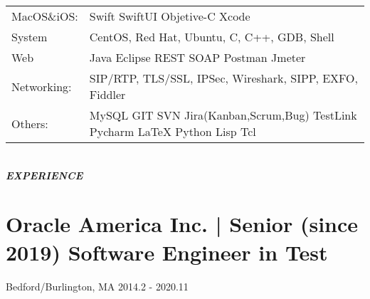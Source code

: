 \documentclass[11pt]{article}
\begin{document}
\begin{tabular}{l l}
MacOS\&iOS: & Swift \textbullet{} SwiftUI \textbullet{} Objetive-C \textbullet{} Xcode \\
System & CentOS, Red Hat, Ubuntu, C, C++, GDB, Shell \\
Web & Java \textbullet{} Eclipse \textbullet{} REST \textbullet{} SOAP \textbullet{} Postman \textbullet{} Jmeter \\
Networking: & SIP/RTP, TLS/SSL, IPSec, Wireshark, SIPP, EXFO, Fiddler \\
Others: & MySQL GIT \textbullet{} SVN \textbullet{} Jira(Kanban,Scrum,Bug) \textbullet{} TestLink Pycharm LaTeX Python Lisp  Tcl \\
\end{tabular}

\noindent \textbf{\textit{\\ EXPERIENCE}}

\section{Oracle America Inc. | Senior (since 2019) Software Engineer in Test}
Bedford/Burlington, MA 2014.2 - 2020.11
\end{document}
